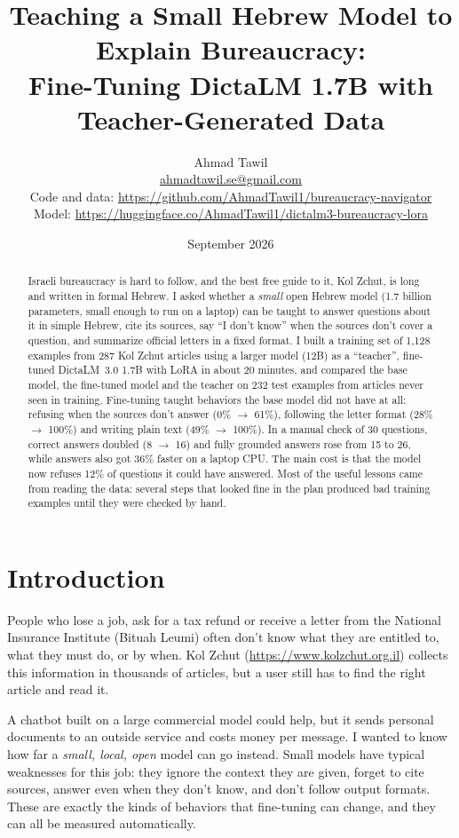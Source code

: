 \documentclass[11pt]{article}
\title{\textbf{Teaching a Small Hebrew Model to Explain Bureaucracy:}\\[2pt]
\large Fine-Tuning DictaLM 1.7B with Teacher-Generated Data}
\author{Ahmad Tawil\\[2pt]
\small \href{mailto:ahmadtawil.se@gmail.com}{ahmadtawil.se@gmail.com}\\[4pt]
\small Code and data: \url{https://github.com/AhmadTawil1/bureaucracy-navigator}\\
\small Model: \url{https://huggingface.co/AhmadTawil1/dictalm3-bureaucracy-lora}}
\date{September 2026}
\begin{document}
\maketitle

\begin{abstract}
\noindent Israeli bureaucracy is hard to follow, and the best free guide to it, Kol Zchut, is long and written in formal Hebrew. I asked whether a \emph{small} open Hebrew model (1.7 billion parameters, small enough to run on a laptop) can be taught to answer questions about it in simple Hebrew, cite its sources, say ``I don't know'' when the sources don't cover a question, and summarize official letters in a fixed format. I built a training set of 1,128 examples from 287 Kol Zchut articles using a larger model (12B) as a ``teacher'', fine-tuned DictaLM~3.0 1.7B with LoRA in about 20 minutes, and compared the base model, the fine-tuned model and the teacher on 232 test examples from articles never seen in training. Fine-tuning taught behaviors the base model did not have at all: refusing when the sources don't answer (0\% $\rightarrow$ 61\%), following the letter format (28\% $\rightarrow$ 100\%) and writing plain text (49\% $\rightarrow$ 100\%). In a manual check of 30 questions, correct answers doubled (8 $\rightarrow$ 16) and fully grounded answers rose from 15 to 26, while answers also got 36\% faster on a laptop CPU. The main cost is that the model now refuses 12\% of questions it could have answered. Most of the useful lessons came from reading the data: several steps that looked fine in the plan produced bad training examples until they were checked by hand.
\end{abstract}

\section{Introduction}

People who lose a job, ask for a tax refund or receive a letter from the National Insurance Institute (Bituah Leumi) often don't know what they are entitled to, what they must do, or by when. Kol Zchut (\url{https://www.kolzchut.org.il}) collects this information in thousands of articles, but a user still has to find the right article and read it.

A chatbot built on a large commercial model could help, but it sends personal documents to an outside service and costs money per message. I wanted to know how far a \emph{small, local, open} model can go instead. Small models have typical weaknesses for this job: they ignore the context they are given, forget to cite sources, answer even when they don't know, and don't follow output formats. These are exactly the kinds of behaviors that fine-tuning can change, and they can all be measured automatically.
\end{document}
